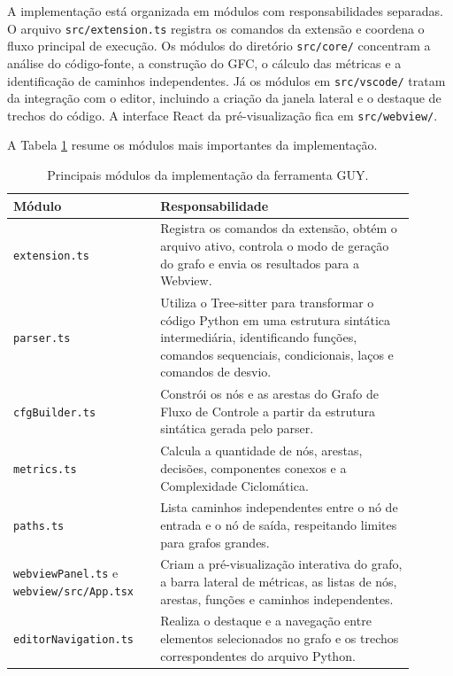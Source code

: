 A implementação está organizada em módulos com responsabilidades separadas. O arquivo \texttt{src/extension.ts} registra os comandos da extensão e coordena o fluxo principal de execução. Os módulos do diretório \texttt{src/core/} concentram a análise do código-fonte, a construção do GFC, o cálculo das métricas e a identificação de caminhos independentes. Já os módulos em \texttt{src/vscode/} tratam da integração com o editor, incluindo a criação da janela lateral e o destaque de trechos do código. A interface React da pré-visualização fica em \texttt{src/webview/}.

A Tabela \ref{tab:estrutura_guy} resume os módulos mais importantes da implementação.

\begin{table}[H]
    \centering
    \caption{Principais módulos da implementação da ferramenta GUY.}
    \begin{tabular}{p{0.32\linewidth} | p{0.58\linewidth}}
        \hline
        \textbf{Módulo} & \textbf{Responsabilidade} \\ \hline
        \texttt{extension.ts} & Registra os comandos da extensão, obtém o arquivo ativo, controla o modo de geração do grafo e envia os resultados para a Webview. \\ \hline
        \texttt{parser.ts} & Utiliza o Tree-sitter para transformar o código Python em uma estrutura sintática intermediária, identificando funções, comandos sequenciais, condicionais, laços e comandos de desvio. \\ \hline
        \texttt{cfgBuilder.ts} & Constrói os nós e as arestas do Grafo de Fluxo de Controle a partir da estrutura sintática gerada pelo parser. \\ \hline
        \texttt{metrics.ts} & Calcula a quantidade de nós, arestas, decisões, componentes conexos e a Complexidade Ciclomática. \\ \hline
        \texttt{paths.ts} & Lista caminhos independentes entre o nó de entrada e o nó de saída, respeitando limites para grafos grandes. \\ \hline
        \texttt{webviewPanel.ts} e \texttt{webview/src/App.tsx} & Criam a pré-visualização interativa do grafo, a barra lateral de métricas, as listas de nós, arestas, funções e caminhos independentes. \\ \hline
        \texttt{editorNavigation.ts} & Realiza o destaque e a navegação entre elementos selecionados no grafo e os trechos correspondentes do arquivo Python. \\ \hline
    \end{tabular}
    \label{tab:estrutura_guy}
\end{table}

